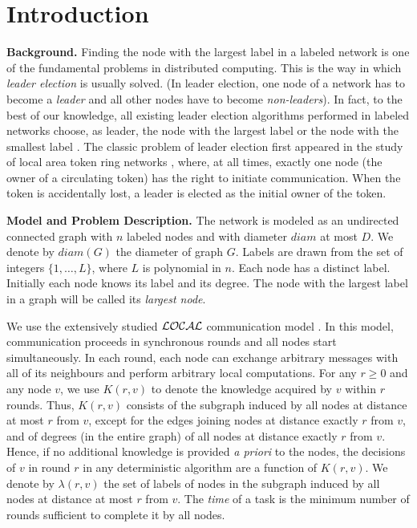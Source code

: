 \documentclass[11pt]{article}
\newcommand{\diam}[1]{\ensuremath{{diam}(#1)}}
\begin{document}
\vfill



\vfill

\thispagestyle{empty}
\setcounter{page}{0}
\pagebreak


\section{Introduction}



{\bf Background.} Finding the node with the largest label in a labeled network is one of the fundamental problems in distributed computing.
This is the way in which {\em leader election} is usually solved. (In leader election, one node of a network has to become a {\em leader}
and all other nodes have to become {\em non-leaders}). In fact, to the best of our knowledge, all existing leader election algorithms
performed in labeled networks choose, as leader, the node with the largest label or the node with the smallest label \cite{Ly}. The classic problem
of leader election first appeared in the study of local area token ring networks \cite{LL}, where, at all times, exactly one node (the owner of a circulating token) has the right to initiate
communication. When the token is accidentally lost, a leader is elected as the initial owner of the token.



\noindent
{\bf Model and Problem Description.} The network is modeled as an undirected connected graph with $n$ labeled nodes and with diameter $diam$ at most $D$.
We denote by $\diam{G}$ the diameter of graph $G$.
Labels are drawn from the set of integers $\{1,\dots,L\}$, where $L$ is polynomial in $n$. Each node has a distinct label.
Initially each node knows its label and its degree. The node with the largest label in a graph will be called its {\em largest node}.

We use the extensively studied $\cal{LOCAL}$ communication model \cite{Pe}. In this model, communication proceeds in synchronous
rounds and all nodes start simultaneously. In each round, each node
can exchange arbitrary messages with all of its neighbours and perform arbitrary local computations. For any $r \geq 0$ and any node $v$, we use
$K(r,v)$ to denote     
the knowledge acquired by $v$ within $r$ rounds. Thus, $K(r,v)$  consists of the subgraph induced by all nodes at distance at most $r$
from $v$, except for the edges joining nodes at distance exactly $r$ from $v$, and of degrees (in the entire graph) of all nodes at distance exactly $r$ from $v$. Hence,
if no additional knowledge is provided {\em a priori} to the nodes, the decisions of $v$ in round $r$ in any deterministic algorithm are a function of $K(r,v)$. We denote by $\lambda(r,v)$ the set of labels of nodes in the subgraph induced by all nodes at distance at most $r$
from $v$.
The {\em time} of a task is the minimum number of rounds sufficient to complete it by all nodes. 
\end{document}
